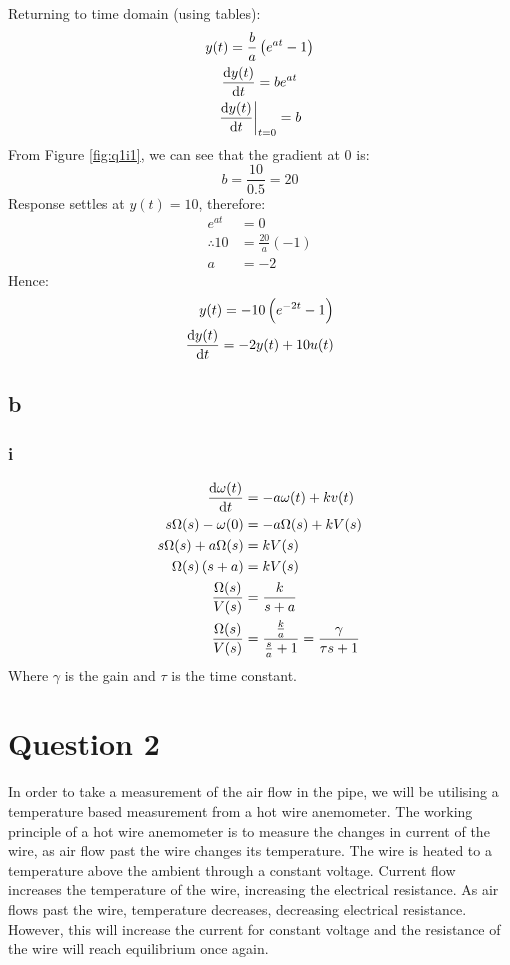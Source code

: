 \documentclass[11pt]{article}
\numberwithin{equation}{section}
\begin{document}
Returning to time domain (using tables):
\begin{gather}
    y(t) = \frac{b}{a} \left(e^{at}-1\right) \label{eq:q1i2}\\
    \frac{\dif y(t)}{\dif t} = be^{at}\\
    \left. \frac{\dif y(t)}{\dif t} \right|_{t = 0} = b
\end{gather}
From Figure \ref{fig:q1i1}, we can see that the gradient at 0 is:
\begin{equation}
    b = \frac{10}{0.5} = 20
\end{equation}
Response settles at $y(t) = 10$, therefore:
\begin{align}
    e^{at} &= 0\\
    \therefore 10 &= \frac{20}{a}\left(-1\right)\\
    a &= -2
\end{align}
Hence:
\begin{align}
    y(t) = -10 \left(e^{-2t}-1\right)\\
    \frac{\dif y(t)}{\dif t} = -2y(t) + 10u(t)
\end{align}
\subsection{b}
\subsubsection{i}
\begin{align}
    \frac{\dif \omega(t)}{\dif t} &= -a\omega(t) + kv(t)\\
    s \Omega(s) - \omega(0) &= -a \Omega(s) + kV(s)\\
    s\Omega(s) +a\Omega (s) &= kV(s)\\
    \Omega(s)\left(s+a\right) &= kV(s)\\
    \frac{\Omega (s)}{V(s)} &= \frac{k}{s+a}\\
    \frac{\Omega (s)}{V(s)} &= \frac{\frac{k}{a}}{\frac{s}{a}+1} = \frac{\gamma}{\tau s + 1}
\end{align}
Where $\gamma$ is the gain and $\tau$ is the time constant.
\section{Question 2} 
In order to take a measurement of the air flow in the pipe, we will be utilising a temperature based measurement from a hot wire anemometer. The working principle of a hot wire anemometer is to measure the changes in current of the wire, as air flow past the wire changes its temperature. The wire is heated to a temperature above the ambient through a constant voltage. Current flow increases the temperature of the wire, increasing the electrical resistance. As air flows past the wire, temperature decreases, decreasing electrical resistance. However, this will increase the current for constant voltage and the resistance of the wire will reach equilibrium once again. 
\end{document}
